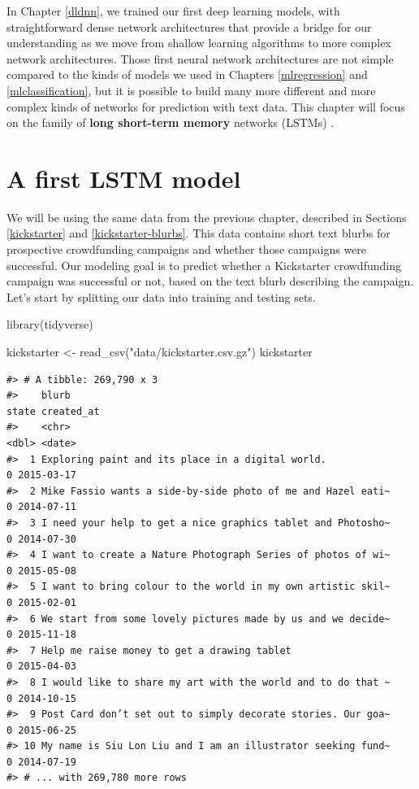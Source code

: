 \documentclass[
]{krantz}
\makeatletter
\newenvironment{Shaded}{\begin{snugshade}}{\end{snugshade}}
\newcommand{\FunctionTok}[1]{\textcolor[rgb]{0.00,0.00,0.00}{#1}}
\newcommand{\NormalTok}[1]{#1}
\newcommand{\OtherTok}[1]{\textcolor[rgb]{0.56,0.35,0.01}{#1}}
\newcommand{\StringTok}[1]{\textcolor[rgb]{0.31,0.60,0.02}{#1}}
\newenvironment{kframe}{%
\medskip{}
\setlength{\fboxsep}{.8em}
 \def\at@end@of@kframe{}%
 \ifinner\ifhmode%
  \def\at@end@of@kframe{\end{minipage}}%
  \begin{minipage}{\columnwidth}%
 \fi\fi%
 \def\FrameCommand##1{\hskip\@totalleftmargin \hskip-\fboxsep
 \colorbox{shadecolor}{##1}\hskip-\fboxsep
     \hskip-\linewidth \hskip-\@totalleftmargin \hskip\columnwidth}%
 \MakeFramed {\advance\hsize-\width
   \@totalleftmargin\z@ \linewidth\hsize
   \@setminipage}}%
 {\par\unskip\endMakeFramed%
 \at@end@of@kframe}
\renewenvironment{Shaded}{\begin{kframe}}{\end{kframe}}
\makeatother
\begin{document}
In Chapter \ref{dldnn}, we trained our first deep learning models, with straightforward dense network architectures that provide a bridge for our understanding as we move from shallow learning algorithms to more complex network architectures. Those first neural network architectures are not simple compared to the kinds of models we used in Chapters \ref{mlregression} and \ref{mlclassification}, but it is possible to build many more different and more complex kinds of networks for prediction with text data. This chapter will focus on the family of \textbf{long short-term memory} networks (LSTMs) \citep{Hochreiter1997}.

\hypertarget{firstlstm}{%
\section{A first LSTM model}\label{firstlstm}}

We will be using the same data from the previous chapter, described in Sections \ref{kickstarter} and \ref{kickstarter-blurbs}. This data contains short text blurbs for prospective crowdfunding campaigns and whether those campaigns were successful. Our modeling goal is to predict whether a Kickstarter crowdfunding campaign was successful or not, based on the text blurb describing the campaign. Let's start by splitting our data into training and testing sets.

\begin{Shaded}
\begin{Highlighting}[]
\FunctionTok{library}\NormalTok{(tidyverse)}

\NormalTok{kickstarter }\OtherTok{\textless{}{-}} \FunctionTok{read\_csv}\NormalTok{(}\StringTok{"data/kickstarter.csv.gz"}\NormalTok{)}
\NormalTok{kickstarter}
\end{Highlighting}
\end{Shaded}

\begin{verbatim}
#> # A tibble: 269,790 x 3
#>    blurb                                                        state created_at
#>    <chr>                                                        <dbl> <date>    
#>  1 Exploring paint and its place in a digital world.                0 2015-03-17
#>  2 Mike Fassio wants a side-by-side photo of me and Hazel eati~     0 2014-07-11
#>  3 I need your help to get a nice graphics tablet and Photosho~     0 2014-07-30
#>  4 I want to create a Nature Photograph Series of photos of wi~     0 2015-05-08
#>  5 I want to bring colour to the world in my own artistic skil~     0 2015-02-01
#>  6 We start from some lovely pictures made by us and we decide~     0 2015-11-18
#>  7 Help me raise money to get a drawing tablet                      0 2015-04-03
#>  8 I would like to share my art with the world and to do that ~     0 2014-10-15
#>  9 Post Card don’t set out to simply decorate stories. Our goa~     0 2015-06-25
#> 10 My name is Siu Lon Liu and I am an illustrator seeking fund~     0 2014-07-19
#> # ... with 269,780 more rows
\end{verbatim}
\end{document}
